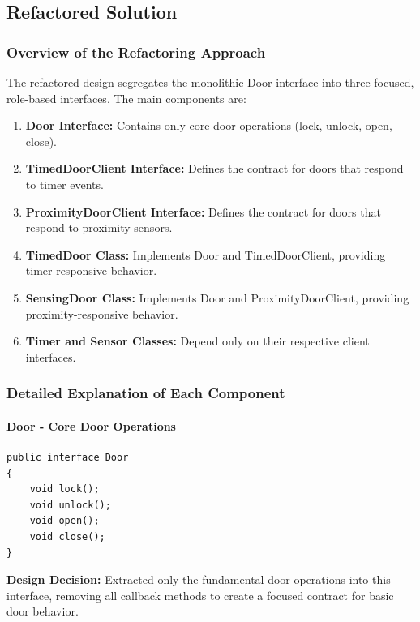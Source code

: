 \subsection{Refactored Solution}

\subsubsection{Overview of the Refactoring Approach}

The refactored design segregates the monolithic Door interface into three focused, role-based interfaces. The main components are:

\begin{enumerate}
    \item \textbf{Door Interface:} Contains only core door operations (lock, unlock, open, close).
    \item \textbf{TimedDoorClient Interface:} Defines the contract for doors that respond to timer events.
    \item \textbf{ProximityDoorClient Interface:} Defines the contract for doors that respond to proximity sensors.
    \item \textbf{TimedDoor Class:} Implements Door and TimedDoorClient, providing timer-responsive behavior.
    \item \textbf{SensingDoor Class:} Implements Door and ProximityDoorClient, providing proximity-responsive behavior.
    \item \textbf{Timer and Sensor Classes:} Depend only on their respective client interfaces.
\end{enumerate}

\subsubsection{Detailed Explanation of Each Component}

\paragraph{Door - Core Door Operations}

\begin{verbatim}
public interface Door
{
    void lock();
    void unlock();
    void open();
    void close();
}
\end{verbatim}

\textbf{Design Decision:} Extracted only the fundamental door operations into this interface, removing all callback methods to create a focused contract for basic door behavior.

